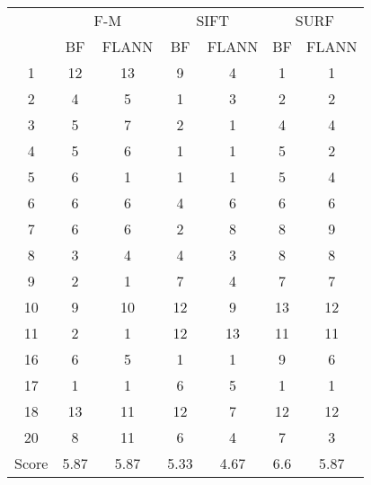 \documentclass[draft,final]{vutinfth} %
\begin{document}
\begin{appendices}
\begin{minipage}{\linewidth}
\centering
\begin{tabular}{c|cc|cc|cc}
& \multicolumn{2}{c}{ F-M } & \multicolumn{2}{c}{ SIFT } & \multicolumn{2}{c}{ SURF } \\
& BF & FLANN & BF & FLANN & BF & FLANN \\
\hline
1 & 12 & 13 & 9 & 4 & 1 & 1 \\
2 & 4 & 5 & 1 & 3 & 2 & 2 \\
3 & 5 & 7 & 2 & 1 & 4 & 4 \\
4 & 5 & 6 & 1 & 1 & 5 & 2 \\
5 & 6 & 1 & 1 & 1 & 5 & 4 \\
6 & 6 & 6 & 4 & 6 & 6 & 6 \\
7 & 6 & 6 & 2 & 8 & 8 & 9 \\
8 & 3 & 4 & 4 & 3 & 8 & 8 \\
9 & 2 & 1 & 7 & 4 & 7 & 7 \\
10 & 9 & 10 & 12 & 9 & 13 & 12 \\
11 & 2 & 1 & 12 & 13 & 11 & 11 \\
16 & 6 & 5 & 1 & 1 & 9 & 6 \\
17 & 1 & 1 & 6 & 5 & 1 & 1 \\
18 & 13 & 11 & 12 & 7 & 12 & 12 \\
20 & 8 & 11 & 6 & 4 & 7 & 3 \\
\hline
Score & 5.87 & 5.87 & 5.33 & 4.67 & 6.6 & 5.87 \\
\end{tabular}
 \label{tab:BL} 
\end{minipage}



\end{appendices}
\end{document}
